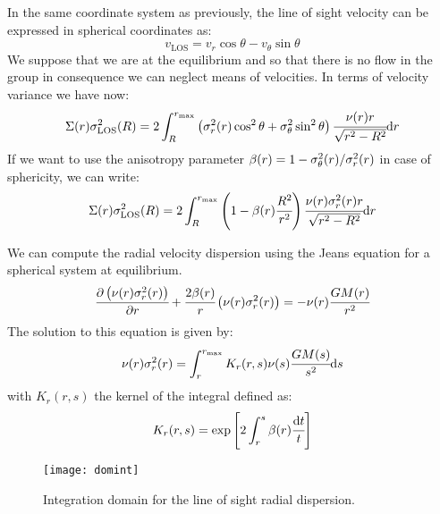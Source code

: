 In the same coordinate system as previously, the line of sight velocity can be
expressed in spherical coordinates as:
%
\begin{equation}
    v_{\mathrm{LOS}} = v_r \cos\theta - v_\theta \sin\theta
\end{equation}
%
We suppose that we are at the equilibrium and so that there is no flow in the
group in consequence we can neglect means of velocities. In terms of velocity
variance we have now:
%
\begin{equation}
    \Sigma(r)\sigma_{\mathrm{LOS}}^2(R) = 2\int_R^{r_{\max}}
    \left({\sigma_r^2(r)\cos^2\theta+\sigma_\theta^2\sin^2\theta}\right)
    \cfrac{\nu{(r)}{r}}{\sqrt{r^2-R^2}}{\rm{d}}{r}
\end{equation}
%
If we want to use the anisotropy parameter
$\beta(r)=1-\sigma_\theta^2(r)/\sigma_r^2(r)$ in case of sphericity, we can write:
%
\begin{equation}
    \Sigma(r)\sigma_{\mathrm{LOS}}^2(R) = 2\int_R^{r_{\max}}
    \left({1-\beta(r)\cfrac{R^2}{r^2}}\right)
    \cfrac{\nu{(r)}{\sigma_r^2(r)}{r}}{\sqrt{r^2-R^2}}{\rm{d}}{r}
\end{equation}

We can compute the radial velocity dispersion using the Jeans equation for a
spherical system at equilibrium.
%
\begin{equation}
    \cfrac{{\partial} \left(\nu(r)\sigma_r^2(r)\right)}{{\partial} r} + \cfrac{2\beta(r)}{r}\left(\nu(r)\sigma_r^2(r)\right)=
    -\nu(r)\cfrac{GM(r)}{r^2}
\end{equation}
%
The solution to this equation is given by:
%
\begin{equation}
    \nu(r)\sigma_r^2(r)=\int_r^{r_{\max}}K_r(r,s)\nu(s)\cfrac{GM(s)}{s^2}{\rm{d}}{s}
\end{equation}
%
with $K_r(r,s)$ the kernel of the integral defined as:
%
\begin{equation}
    K_r(r,s)=\exp\left[2\int_r^s\beta(r)\cfrac{{\rm{d}}{t}}{t}\right]
\end{equation}
%
\begin{figure}[H]
    \centering
    \texttt{[image: domint]}
    \caption{\footnotesize{}Integration domain for the line of sight radial dispersion.}
\label{fig:domint}
\end{figure}
%
